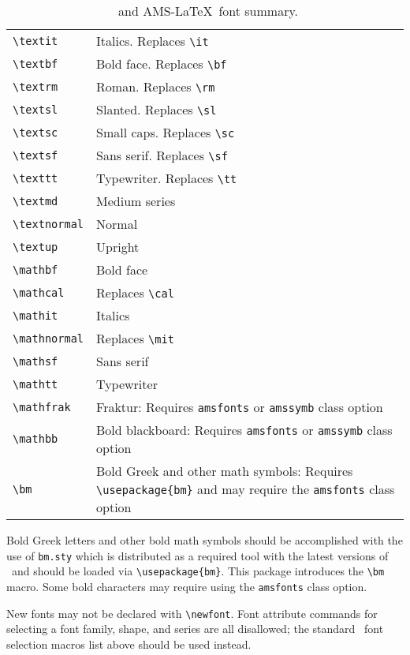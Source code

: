 \documentclass[twocolumn,secnumarabic,amssymb, nobibnotes, aps, prd]{revtex4-1}
\newcommand{\classoption}[1]{\texttt{#1}}
\newcommand{\macro}[1]{\texttt{\textbackslash#1}}
\newcommand{\m}[1]{\macro{#1}}
\begin{document}
\begin{table}
\caption{\label{tab:fonts}\LaTeXe\ and AMS-\LaTeX\ font summary.}
\begin{ruledtabular}
\begin{tabular}{lp{2in}}
\m{textit} & Italics. Replaces \m{it}\\
\m{textbf} & Bold face. Replaces \m{bf}\\
\m{textrm} & Roman. Replaces \m{rm}\\
\m{textsl} & Slanted. Replaces \m{sl}\\
\m{textsc} & Small caps. Replaces \m{sc}\\
\m{textsf} & Sans serif. Replaces \m{sf}\\
\m{texttt} & Typewriter. Replaces \m{tt}\\
\m{textmd} & Medium series\\
\m{textnormal} & Normal\\
\m{textup} & Upright\\
\m{mathbf} & Bold face\\
\m{mathcal} & Replaces \m{cal}\\
\m{mathit} & Italics\\
\m{mathnormal} & Replaces \m{mit}\\
\m{mathsf} & Sans serif\\
\m{mathtt} & Typewriter\\
\m{mathfrak} & Fraktur: Requires \classoption{amsfonts} or \classoption{amssymb} class option\\
\m{mathbb} & Bold blackboard: Requires \classoption{amsfonts} or \classoption{amssymb} class option\\
\m{bm} & Bold Greek and other math symbols: Requires
\verb+\usepackage{bm}+ and may require the \classoption{amsfonts} class
option
\end{tabular}
\end{ruledtabular}
\end{table}

Bold Greek letters and other bold math symbols should be accomplished
with the use of \texttt{bm.sty} which is distributed as a required
tool with the latest versions of \LaTeXe\ and should be loaded via
\verb+\usepackage{bm}+. This package introduces the \m{bm}
macro. Some bold characters may require using the
\classoption{amsfonts} class option.

New fonts may not be declared with \m{newfont}. Font attribute
commands for selecting a font family, shape, and series are all
disallowed; the standard \LaTeXe\ font selection macros list above
should be used instead.
\end{document}
